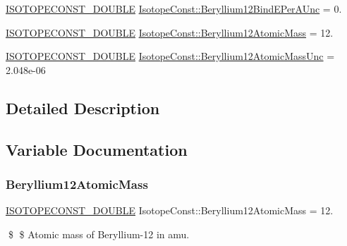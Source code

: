 \begin{DoxyCompactItemize}
\mbox{\hyperlink{group___isotope_const-_macros_ga8f45a7272ce02c0b4c65c44636ed719a}{I\+S\+O\+T\+O\+P\+E\+C\+O\+N\+S\+T\+\_\+\+D\+O\+U\+B\+LE}} \mbox{\hyperlink{group___isotope_const-_beryllium-_be12_ga63ccd65c029cae40198d07d7f33943da}{Isotope\+Const\+::\+Beryllium12\+Bind\+E\+Per\+A\+Unc}} = 0.
\item 
\mbox{\hyperlink{group___isotope_const-_macros_ga8f45a7272ce02c0b4c65c44636ed719a}{I\+S\+O\+T\+O\+P\+E\+C\+O\+N\+S\+T\+\_\+\+D\+O\+U\+B\+LE}} \mbox{\hyperlink{group___isotope_const-_beryllium-_be12_gae5243749ab1976393a977b308f7eacf8}{Isotope\+Const\+::\+Beryllium12\+Atomic\+Mass}} = 12.
\item 
\mbox{\hyperlink{group___isotope_const-_macros_ga8f45a7272ce02c0b4c65c44636ed719a}{I\+S\+O\+T\+O\+P\+E\+C\+O\+N\+S\+T\+\_\+\+D\+O\+U\+B\+LE}} \mbox{\hyperlink{group___isotope_const-_beryllium-_be12_gae84b1469335637d893195a49d63b26cc}{Isotope\+Const\+::\+Beryllium12\+Atomic\+Mass\+Unc}} = 2.\+048e-\/06
\end{DoxyCompactItemize}


\subsection{Detailed Description}


\subsection{Variable Documentation}
\mbox{\label{group___isotope_const-_beryllium-_be12_gae5243749ab1976393a977b308f7eacf8}} 
\subsubsection{\texorpdfstring{Beryllium12\+Atomic\+Mass}{Beryllium12AtomicMass}}
{\footnotesize\ttfamily \mbox{\hyperlink{group___isotope_const-_macros_ga8f45a7272ce02c0b4c65c44636ed719a}{I\+S\+O\+T\+O\+P\+E\+C\+O\+N\+S\+T\+\_\+\+D\+O\+U\+B\+LE}} Isotope\+Const\+::\+Beryllium12\+Atomic\+Mass = 12.}

\$ \$ Atomic mass of Beryllium-\/12 in amu. \mbox{\label{group___isotope_const-_beryllium-_be12_gae84b1469335637d893195a49d63b26cc}} 
